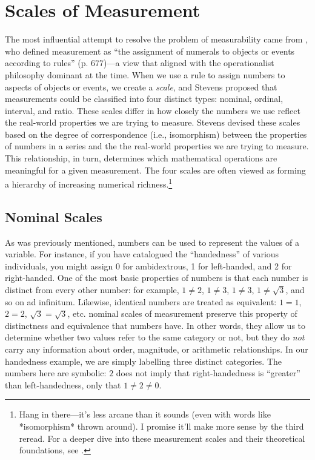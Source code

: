 \section{Scales of Measurement}

The most influential attempt to resolve the problem of measurability came from \textcite{Stevens1946}, who defined measurement as ``the assignment of numerals to objects or events according to rules'' (p. 677)—a view that aligned with the operationalist philosophy dominant at the time. When we use a rule to assign numbers to aspects of objects or events, we create a \textit{scale}, and Stevens proposed that measurements could be classified into four distinct types: nominal, ordinal, interval, and ratio. These scales differ in how closely the numbers we use reflect the real-world properties we are trying to measure. Stevens devised these scales based on the degree of correspondence (i.e., isomorphism) between the properties of numbers in a series and the the real-world properties we are trying to measure. This relationship, in turn, determines which mathematical operations are meaningful for a given measurement. The four scales are often viewed as forming a hierarchy of increasing numerical richness.\footnote{Hang in there—it’s less arcane than it sounds (even with words like *isomorphism* thrown around). I promise it’ll make more sense by the third reread. For a deeper dive into these measurement scales and their theoretical foundations, see \citeauthor{Stevens1951} \citeyear{Stevens1951}.}

\subsection{Nominal Scales}
\label{sec:nominal}

As was previously mentioned, numbers can be used to represent the values of a variable. For instance, if you have catalogued the ``handedness'' of various individuals, you might assign 0 for ambidextrous, 1 for left-handed, and 2 for right-handed. One of the most basic properties of numbers is that each number is distinct from every other number: for example, $1 \neq 2$, $1 \neq 3$, $1 \neq 3$, $1 \neq \sqrt{3}$, and so on ad infinitum. Likewise, identical numbers are treated as equivalent: $1 = 1$, $2 = 2$, $\sqrt{3} = \sqrt{3}$, etc. \Glspl{nominal scale} of measurement preserve this property of distinctness and equivalence that numbers have. In other words, they allow us to determine whether two values refer to the same category or not, but they do \textit{not} carry any information about order, magnitude, or arithmetic relationships. In our handedness example, we are simply labelling three distinct categories. The numbers here are symbolic: $2$ does not imply that right-handedness is ``greater'' than left-handedness, only that $1 \neq 2 \neq 0$.


